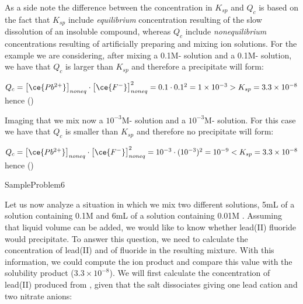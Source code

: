 \documentclass[main.tex]{subfiles}
\begin{document}
\begin{description}
 \begin{center}  \end{center}
As a side note the difference between the concentration in $K_{sp}$ and $Q_c$ is based on the fact that $K_{sp}$ include \emph{equilibrium} concentration resulting of the slow dissolution of an insoluble compound, whereas $Q_c$ include \emph{nonequilibrium} concentrations resulting of artificially preparing and mixing ion solutions. For the example we are considering, after mixing a 0.1M- solution and a 0.1M- solution, we have that  $Q_c$ is larger than $K_{sp}$ and therefore a precipitate will form:
\begin{center} $Q_{c}= \big[ \ce{Pb^{2+}} \big]_{noneq}\cdot \big[ \ce{F^{-}} \big]^2_{noneq}=0.1\cdot 0.1^2=1\times 10^{-3}>K_{sp}=3.3\times10^{-8}$ hence ()\end{center}
Imaging that we mix now a $10^{-3}$M- solution and a $10^{-3}$M- solution. For this case we have that $Q_c$ is smaller than $K_{sp}$ and therefore no precipitate will form:
\begin{center} $Q_{c}= \big[ \ce{Pb^{2+}} \big]_{noneq}\cdot \big[ \ce{F^{-}} \big]^2_{noneq}=10^{-3}\cdot (10^{-3})^2=10^{-9}<K_{sp}=3.3\times10^{-8}$ hence ()\end{center}
  {SampleProblem6}
\item[\docfilehook{Predicting precipitation from mixing solutions}{}] 
Let us now analyze a situation in which we mix two different solutions, 5mL of a solution containing 0.1M  and 6mL of a solution containing 0.01M . Assuming that liquid volume can be added, we would like to know whether lead(II) fluoride would precipitate. To answer this question, we need to calculate the concentration of lead(II) and of fluoride in the resulting mixture. With this information, we could compute the ion product and compare this value with the solubility product ($3.3\times10^{-8}$). We will first calculate the concentration of lead(II) produced from , given that the salt dissociates giving one lead cation and two nitrate anions:

\end{description}
\end{document}
